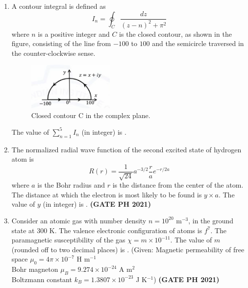 \documentclass[14pt, a4paper]{extarticle}
\begin{document}
\begin{enumerate}[label=\textbf{Q.\arabic*}]
\begin{enumerate}[label=\textbf{Q.\arabic*}]
\item A contour integral is defined as
$$ I_n = \oint_C \frac{dz}{(z-n)^2 + \pi^2} $$
where $n$ is a positive integer and $C$ is the closed contour, as shown in the figure, consisting of the line from $-100$ to $100$ and the semicircle traversed in the counter-clockwise sense.
\begin{figure}[H]
\centering
\includegraphics[width=0.4\textwidth]{figs/q60fig21.png}
\caption{Closed contour C in the complex plane.}
\label{fig:q50ph}
\end{figure}
The value of $\sum_{n=1}^{5} I_n$ (in integer) is \underline{\hspace{3cm}}.

\item The normalized radial wave function of the second excited state of hydrogen atom is
$$ R(r) = \frac{1}{\sqrt{24}} a^{-3/2} \frac{r}{a} e^{-r/2a} $$
where $a$ is the Bohr radius and $r$ is the distance from the center of the atom. The distance at which the electron is most likely to be found is $y \times a$. The value of $y$ (in integer) is \underline{\hspace{3cm}}.
\hfill \textbf{(GATE PH 2021)}

\item Consider an atomic gas with number density $n = 10^{20}$ m$^{-3}$, in the ground state at 300 K. The valence electronic configuration of atoms is $f^7$. The paramagnetic susceptibility of the gas $\chi = m \times 10^{-11}$. The value of $m$ (rounded off to two decimal places) is \underline{\hspace{3cm}}.
(Given: Magnetic permeability of free space $\mu_0 = 4\pi \times 10^{-7}$ H m$^{-1}$ \\
Bohr magneton $\mu_B = 9.274 \times 10^{-24}$ A m$^2$ \\
Boltzmann constant $k_B = 1.3807 \times 10^{-23}$ J K$^{-1}$)
\hfill \textbf{(GATE PH 2021)}


\end{enumerate}
\end{enumerate}
\end{document}

